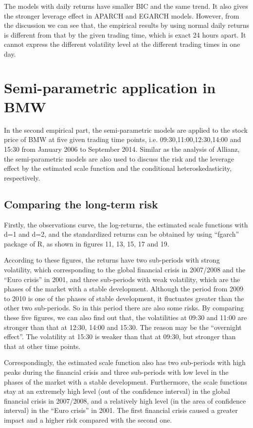 The models with daily returns have smaller BIC and the same trend. It also gives the stronger leverage effect in APARCH and EGARCH models. However, from the discussion we can see that, the empirical results by using normal daily returns is different from that by the given trading time, which is exact 24 hours apart. It cannot express the different volatility level at the different trading times in one day.

\section{Semi-parametric application in BMW}

In the second empirical part, the semi-parametric models are applied to the stock price of BMW at five given trading time points, i.e. 09:30,11:00,12:30,14:00 and 15:30 from January 2006 to September 2014. Similar as the analysis of Allianz, the semi-parametric models are also used to discuss the risk and the leverage effect by the estimated scale function and the conditional heteroskedasticity, respectively.

\subsection{Comparing the long-term risk}

Firstly, the observations curve, the log-returns, the estimated scale functions with d=1 and d=2, and the standardized returns can be obtained by using ``fgarch'' package of R, as shown in figures 11, 13, 15, 17 and 19.

According to these figures, the returns have two sub-periods with strong volatility, which corresponding to the global financial crisis in 2007/2008 and the ``Euro crisis'' in 2001, and three sub-periods with weak volatility, which are the phases of the market with a stable development. Although the period from 2009 to 2010 is one of the phases of stable development, it fluctuates greater than the other two sub-periods. So in this period there are also some risks. By comparing these five figures, we can also find out that, the volatilities at 09:30 and 11:00 are stronger than that at 12:30, 14:00 and 15:30. The reason may be the ``overnight effect''. The volatility at 15:30 is weaker than that at 09:30, but stronger than that at other time points.

Correspondingly, the estimated scale function also has two sub-periods with high peaks during the financial crisis and three sub-periods with low level in the phases of the market with a stable development. Furthermore, the scale functions stay at an extremely high level (out of the confidence interval) in the global financial crisis in 2007/2008, and a relatively high level (in the area of confidence interval) in the ``Euro crisis'' in 2001. The first financial crisis caused a greater impact and a higher risk compared with the second one. 

